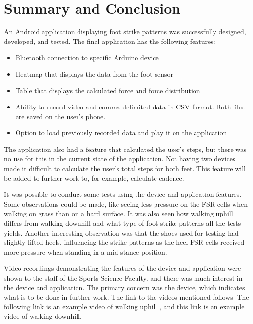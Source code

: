 \graphicspath{{conclusion/fig/}}

\chapter{Summary and Conclusion}
\label{chap:conclusion}
An Android application displaying foot strike patterns was successfully designed, developed, and tested. The final application has the following features:
\begin{itemize}
    \item Bluetooth connection to specific Arduino device
    \item Heatmap that displays the data from the foot sensor
    \item Table that displays the calculated force and force distribution
    \item Ability to record video and comma-delimited data in CSV format. Both files are saved on the user's phone.
    \item Option to load previously recorded data and play it on the application
  \end{itemize}

The application also had a feature that calculated the user's steps, but there was no use for this in the current state of the application. Not having two devices made it difficult to calculate the user's total steps for both feet. This feature will be added to further work to, for example, calculate cadence.

  It was possible to conduct some tests using the device and application features. Some observations could be made, like seeing less pressure on the FSR cells when walking on grass than on a hard surface. It was also seen how walking uphill differs from walking downhill and what type of foot strike patterns all the tests yields. Another interesting observation was that the shoes used for testing had slightly lifted heels, influencing the strike patterns as the heel FSR cells received more pressure when standing in a mid-stance position.

  Video recordings demonstrating the features of the device and application were shown to the staff of the Sports Science Faculty, and there was much interest in the device and application. The primary concern was the device, which indicates what is to be done in further work. The link to the videos mentioned follows. The following link is an example video of walking uphill \cite{dewaldtsnymanup2022}, and this link \cite{dewaldtsnymandown2022} is an example video of walking downhill. 

